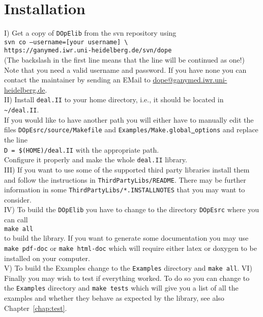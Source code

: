 \section{Installation}
I) Get a copy of \texttt{DOpElib} from the svn repository using\\
\texttt{svn co --username=[your username] \textbackslash \\ \hspace*{5mm}https://ganymed.iwr.uni-heidelberg.de/svn/dope}\\
(The backslash in the first line means that the line will be continued as one!)
Note that you need a valid username and password. If you have none you can contact the 
maintainer by sending an EMail to \url{dope@ganymed.iwr.uni-heidelberg.de}.\\[3mm]
%
II) Install \texttt{deal.II} to your home directory, i.e., it should be located in \\
\texttt{\textasciitilde/deal.II}. \\[1mm]
If you would like to have another path you will either have to manually edit the files
\texttt{DOpEsrc/source/Makefile} and \texttt{Examples/Make.global\underline{ }options} and replace the 
line \\
\texttt{D = \$(HOME)/deal.II} with the appropriate path.\\[1mm]
Configure it properly and make the whole \texttt{deal.II} library.\\[3mm]
%
III) If you want to use some of the supported third party libraries install them and follow 
 the instructions in \texttt{ThirdPartyLibs/README}. There may be further information 
 in some \texttt{ThirdPartyLibs/*.INSTALLNOTES} that you may want to consider.\\[3mm]
%
IV) To build the \texttt{DOpElib} you have to change to the directory 
\texttt{DOpEsrc} where you can call\\ 
\texttt{make all}\\
to build the library. If you want to generate some documentation you may use
\texttt{make pdf-doc} or \texttt{make html-doc} which will require either 
latex or doxygen to be installed on your computer.\\[3mm]
%
V) To build the Examples change to the \texttt{Examples} directory and \texttt{make all}.
%
VI) Finally you may wish to test if everything worked. To do so you can 
change to the \texttt{Examples} directory and \texttt{make tests} which will give you a 
list of all the examples and whether they behave as expected by the library, see also 
Chapter~\ref{chap:test}.

